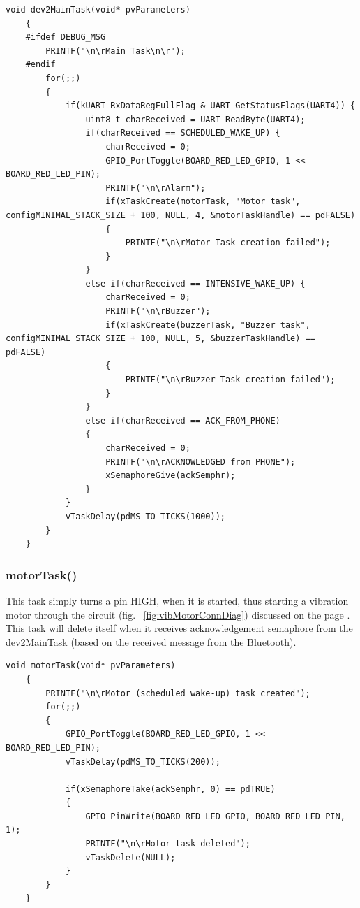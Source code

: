 \documentclass[12pt,a4paper]{article}
\begin{document}
    \begin{lstlisting}[label={lst:dev2MainTask}, caption=dev2MainTask() task]
    void dev2MainTask(void* pvParameters)
    {
    #ifdef DEBUG_MSG
        PRINTF("\n\rMain Task\n\r");
    #endif
        for(;;)
        {
            if(kUART_RxDataRegFullFlag & UART_GetStatusFlags(UART4)) {
                uint8_t charReceived = UART_ReadByte(UART4);
                if(charReceived == SCHEDULED_WAKE_UP) {
                    charReceived = 0;
                    GPIO_PortToggle(BOARD_RED_LED_GPIO, 1 << BOARD_RED_LED_PIN);
                    PRINTF("\n\rAlarm");
                    if(xTaskCreate(motorTask, "Motor task", configMINIMAL_STACK_SIZE + 100, NULL, 4, &motorTaskHandle) == pdFALSE)
                    {
                        PRINTF("\n\rMotor Task creation failed");
                    }
                }
                else if(charReceived == INTENSIVE_WAKE_UP) {
                    charReceived = 0;
                    PRINTF("\n\rBuzzer");
                    if(xTaskCreate(buzzerTask, "Buzzer task", configMINIMAL_STACK_SIZE + 100, NULL, 5, &buzzerTaskHandle) == pdFALSE)
                    {
                        PRINTF("\n\rBuzzer Task creation failed");
                    }
                }
                else if(charReceived == ACK_FROM_PHONE)
                {
                    charReceived = 0;
                    PRINTF("\n\rACKNOWLEDGED from PHONE");
                    xSemaphoreGive(ackSemphr);
                }
            }
            vTaskDelay(pdMS_TO_TICKS(1000));
        }
    }
    \end{lstlisting}
    
    \subsubsection*{motorTask()}
    This task simply turns a pin HIGH, when it is started, thus starting a vibration motor through the circuit (fig. ~\ref{fig:vibMotorConnDiag}) discussed on the page \pageref{fig:vibMotorConnDiag}. This task will delete itself when it receives acknowledgement semaphore from the dev2MainTask (based on the received message from the Bluetooth).

    \begin{lstlisting}[label={lst:motorTask}, caption=motorTask() task]
    void motorTask(void* pvParameters)
    {
        PRINTF("\n\rMotor (scheduled wake-up) task created");
        for(;;)
        {
            GPIO_PortToggle(BOARD_RED_LED_GPIO, 1 << BOARD_RED_LED_PIN);
            vTaskDelay(pdMS_TO_TICKS(200));

            if(xSemaphoreTake(ackSemphr, 0) == pdTRUE)
            {
                GPIO_PinWrite(BOARD_RED_LED_GPIO, BOARD_RED_LED_PIN, 1);
                PRINTF("\n\rMotor task deleted");
                vTaskDelete(NULL);
            }
        }
    }
    \end{lstlisting}
    
\end{document}
